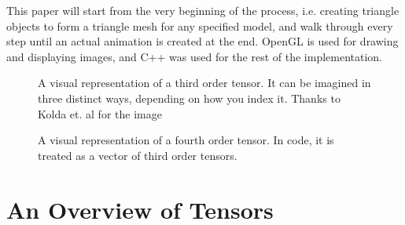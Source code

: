 \documentclass[twocolumn,10pt]{asme2ej}
\begin{document}
This paper will start from the very beginning of the process, i.e. creating triangle objects to form a triangle mesh for any
specified model, and walk through every step until an actual animation is created at the end. OpenGL is used for drawing and displaying images, and C++ was used for the rest of the implementation.

\begin{figure}
\caption{A visual representation of a third order tensor. It can be imagined in three distinct ways, depending on how you index it. Thanks to Kolda et. al for the image \cite{tensors}}
\label{fig_ex1.png}
\end{figure}
\begin{figure}
\caption{A visual representation of a fourth order tensor. In code, it is treated as a vector of third order tensors.}
\label{fig_ex2.png}
\end{figure}

\section{An Overview of Tensors}
\end{document}
